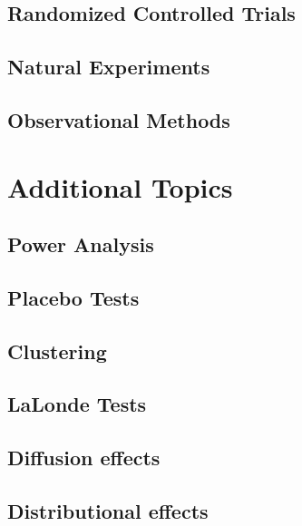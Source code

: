 \documentclass[]{book}
\theoremstyle{definition}
\theoremstyle{definition}
\theoremstyle{definition}
\theoremstyle{remark}
\begin{document}
\hypertarget{RCT}{%
\chapter{Randomized Controlled Trials}\label{RCT}}

\hypertarget{NE}{%
\chapter{Natural Experiments}\label{NE}}

\hypertarget{OM}{%
\chapter{Observational Methods}\label{OM}}

\hypertarget{part-additional-topics}{%
\part{Additional Topics}\label{part-additional-topics}}

\hypertarget{Power}{%
\chapter{Power Analysis}\label{Power}}

\hypertarget{Placebo}{%
\chapter{Placebo Tests}\label{Placebo}}

\hypertarget{cluster}{%
\chapter{Clustering}\label{cluster}}

\hypertarget{LaLonde}{%
\chapter{LaLonde Tests}\label{LaLonde}}

\hypertarget{Diffusion}{%
\chapter{Diffusion effects}\label{Diffusion}}

\hypertarget{Distribution}{%
\chapter{Distributional effects}\label{Distribution}}
\end{document}

